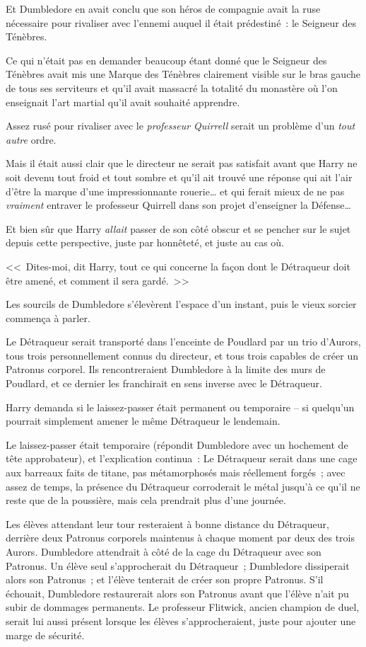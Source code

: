 Et Dumbledore en avait conclu que son héros de compagnie avait la ruse nécessaire pour rivaliser avec l'ennemi auquel il était prédestiné~: le Seigneur des Ténèbres.

Ce qui n'était pas en demander beaucoup étant donné que le Seigneur des Ténèbres avait mis une Marque des Ténèbres clairement visible sur le bras gauche de tous ses serviteurs et qu'il avait massacré la totalité du monastère où l'on enseignait l'art martial qu'il avait souhaité apprendre.

Assez rusé pour rivaliser avec le \emph{professeur Quirrell} serait un problème d'un \emph{tout} \emph{autre} ordre.

Mais il était aussi clair que le directeur ne serait pas satisfait avant que Harry ne soit devenu tout froid et tout sombre et qu'il ait trouvé une réponse qui ait l'air d'être la marque d'une impressionnante rouerie… et qui ferait mieux de ne pas \emph{vraiment} entraver le professeur Quirrell dans son projet d'enseigner la Défense…

Et bien sûr que Harry \emph{allait} passer de son côté obscur et se pencher sur le sujet depuis cette perspective, juste par honnêteté, et juste au cas où.

<<~Dites-moi, dit Harry, tout ce qui concerne la façon dont le Détraqueur doit être amené, et comment il sera gardé.~>>

Les sourcils de Dumbledore s'élevèrent l'espace d'un instant, puis le vieux sorcier commença à parler.

Le Détraqueur serait transporté dans l'enceinte de Poudlard par un trio d'Aurors, tous trois personnellement connus du directeur, et tous trois capables de créer un Patronus corporel. Ils rencontreraient Dumbledore à la limite des murs de Poudlard, et ce dernier les franchirait en sens inverse avec le Détraqueur.

Harry demanda si le laissez-passer était permanent ou temporaire -- si quelqu'un pourrait simplement amener le même Détraqueur le lendemain.

Le laissez-passer était temporaire (répondit Dumbledore avec un hochement de tête approbateur), et l'explication continua~: Le Détraqueur serait dans une cage aux barreaux faits de titane, pas métamorphosés mais réellement forgés~; avec assez de temps, la présence du Détraqueur corroderait le métal jusqu'à ce qu'il ne reste que de la poussière, mais cela prendrait plus d'une journée.

Les élèves attendant leur tour resteraient à bonne distance du Détraqueur, derrière deux Patronus corporels maintenus à chaque moment par deux des trois Aurors. Dumbledore attendrait à côté de la cage du Détraqueur avec son Patronus. Un élève seul s'approcherait du Détraqueur~; Dumbledore dissiperait alors son Patronus~; et l'élève tenterait de créer son propre Patronus. S'il échouait, Dumbledore restaurerait alors son Patronus avant que l'élève n'ait pu subir de dommages permanents. Le professeur Flitwick, ancien champion de duel, serait lui aussi présent lorsque les élèves s'approcheraient, juste pour ajouter une marge de sécurité.

